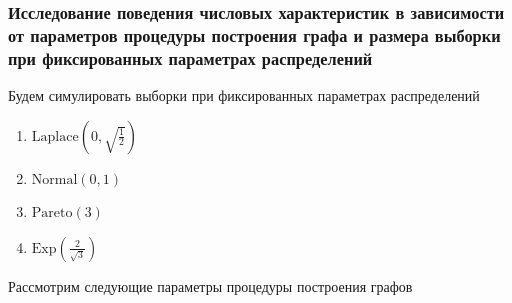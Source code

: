 \documentclass[a4paper,12pt]{article}
\begin{document}
\subsubsection{Исследование поведения числовых характеристик в зависимости от параметров процедуры построения графа и размера выборки при фиксированных параметрах распределений}
Будем симулировать выборки при фиксированных параметрах распределений
\begin{enumerate}
    \item $\text{Laplace}\left( 0, \sqrt{\frac{1}{2}}\right)$
    \item $\text{Normal} \left(0, 1 \right)$
    \item $\text{Pareto} (3)$
    \item $\text{Exp} \left(\frac{2}{\sqrt{3}} \right)$
\end{enumerate}
Рассмотрим следующие параметры процедуры построения графов
\end{document}
